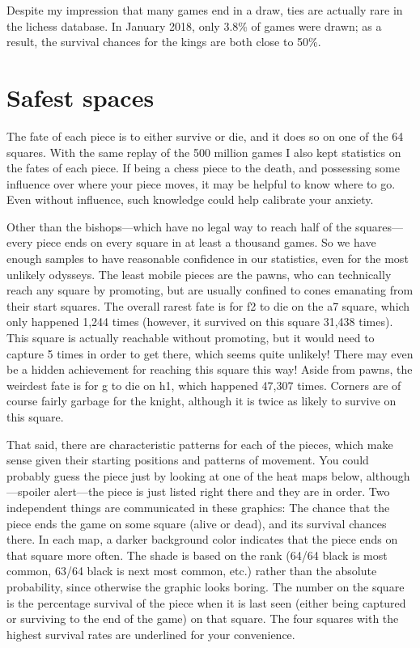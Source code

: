 \documentclass[twocolumn]{article}
\begin{document}
Despite my impression that many games end in a draw, ties are actually
rare in the lichess database. In January 2018, only 3.8\% of games
were drawn;
as a result, the survival chances for the kings are both close to
50\%.

\section{Safest spaces}

The fate of each piece is to either survive or die, and it does so on
one of the 64 squares. With the same replay of the 500 million games
I also kept statistics on the fates of each piece. If being a chess
piece to the death, and possessing some influence over where your piece
moves, it may be helpful to know where to go. Even without influence,
such knowledge could help calibrate your anxiety.

Other than the bishops---which have no legal way to reach half of the
squares---every piece ends on every square in at least a thousand
games. So we have enough samples to have reasonable confidence in our
statistics, even for the most unlikely odysseys. The least mobile
pieces are the pawns, who can technically reach any square by
promoting, but are usually confined to cones emanating from their
start squares. The overall rarest fate is for \pawn f2 to die on the
a7 square, which only happened 1,244 times (however, it survived on
this square 31,438 times). This square is actually reachable without
promoting, but it would need to capture 5 times in order to get
there, which seems quite unlikely! There may even be a hidden
achievement for reaching this square this way!
Aside from pawns, the weirdest fate is for \knight g to die on h1,
which happened 47,307 times. Corners are of course fairly garbage for
the knight, although it is twice as likely to survive on this square.


That said, there are characteristic patterns for each of the pieces,
which make sense given their starting positions and patterns of
movement. You could probably guess the piece just by looking at one of
the heat maps below, although---spoiler alert---the piece is just
listed right there and they are in order. Two independent things are
communicated in these graphics: The chance that the piece ends the
game on some square (alive or dead), and its survival chances there.
In each map, a darker background color indicates that the piece ends
on that square more often. The shade is based on the rank (64/64 black
is most common, 63/64 black is next most common, etc.) rather than the
absolute probability, since otherwise the graphic looks boring. The
number on the square is the percentage survival of the piece when it
is last seen (either being captured or surviving to the end of the
game) on that square. The four squares with the highest survival rates
are underlined for your convenience.
\end{document}
